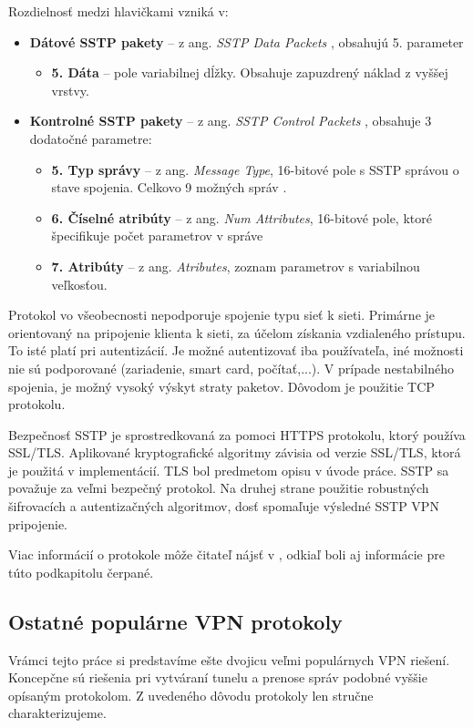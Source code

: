 Rozdielnosť medzi hlavičkami vzniká v:
\begin{itemize}
	\item{\textbf{Dátové SSTP pakety}} -- z ang. \textit{SSTP Data Packets} \cite{datpak}, obsahujú 5. parameter 
		\begin{itemize}
			\item{\textbf{5. Dáta}} -- pole variabilnej dĺžky. Obsahuje zapuzdrený náklad z vyššej vrstvy.
		\end{itemize} 
	\item{\textbf{Kontrolné SSTP pakety}} -- z ang. \textit{SSTP Control Packets} \cite{conpak}, obsahuje 3 dodatočné parametre:
		\begin{itemize}
			\item{\textbf{5. Typ správy}} -- z ang. \textit{Message Type}, 16-bitové pole s SSTP správou o stave spojenia. Celkovo 9 možných správ \cite{conpak}. 
			\item{\textbf{6. Číselné atribúty}} -- z ang. \textit{Num Attributes}, 16-bitové pole, ktoré špecifikuje počet parametrov v správe
			\item{\textbf{7. Atribúty}} -- z ang. \textit{Atributes}, zoznam parametrov s variabilnou veľkosťou.
		\end{itemize}	
\end{itemize}   
 
Protokol vo všeobecnosti nepodporuje spojenie typu sieť k sieti. Primárne je orientovaný na pripojenie klienta k sieti, za účelom získania vzdialeného prístupu. To isté platí pri autentizácií. Je možné autentizovať iba používateľa, iné možnosti nie sú podporované (zariadenie, smart card, počítať,...). V prípade nestabilného spojenia, je možný vysoký výskyt straty paketov. Dôvodom je použitie TCP protokolu. 

Bezpečnosť SSTP je sprostredkovaná za pomoci HTTPS protokolu, ktorý používa SSL/TLS. Aplikované kryptografické algoritmy závisia od verzie SSL/TLS, ktorá je použitá v implementácií. TLS bol predmetom opisu v úvode práce. SSTP sa považuje za veľmi bezpečný protokol. Na druhej strane použitie robustných šifrovacích a autentizačných algoritmov, dosť spomaľuje výsledné SSTP VPN pripojenie.

Viac informácií o protokole môže čitateľ nájsť v \cite{mssstp}, odkiaľ boli aj informácie pre túto podkapitolu čerpané.  


\subsection{Ostatné populárne VPN protokoly}
Vrámci tejto práce si predstavíme ešte dvojicu veľmi populárnych VPN riešení. Koncepčne sú riešenia pri vytváraní tunelu a prenose správ podobné vyššie opísaným protokolom. Z uvedeného dôvodu protokoly len stručne charakterizujeme.
